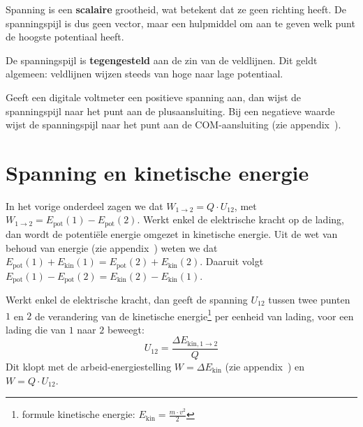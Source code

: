 \documentclass{ximera}
\begin{document}
\begin{remark}[expandable=true,title={Scalaire grootheid}]\nl
Spanning is een \textbf{scalaire} grootheid, wat betekent dat ze geen richting heeft. De spanningspijl is dus geen vector, maar een hulpmiddel om aan te geven welk punt de hoogste potentiaal heeft.
\end{remark}
\begin{remark}[expandable=true,title={Spanningspijl en veldlijnen}]\nl
De spanningspijl is \textbf{tegengesteld} aan de zin van de veldlijnen. Dit geldt algemeen: veldlijnen wijzen steeds van hoge naar lage potentiaal.
\end{remark}
\begin{remark}[expandable=true,title={Spanningspijl en voltmeter}]\nl
Geeft een digitale voltmeter een positieve spanning aan, dan wijst de spanningspijl naar het punt aan de plusaansluiting. Bij een negatieve waarde wijst de spanningspijl naar het punt aan de COM-aansluiting (zie appendix~).
\end{remark}

\section{Spanning en kinetische energie}
In het vorige onderdeel zagen we dat $W_{1 \to 2} = Q \cdot U_{12}$, met $W_{1 \to 2} = E_{\text{pot}}(1) - E_{\text{pot}}(2)$. Werkt enkel de elektrische kracht op de lading, dan wordt de potentiële energie omgezet in kinetische energie. Uit de wet van behoud van energie (zie appendix~) weten we dat $E_{\text{pot}}(1) + E_{\text{kin}}(1) = E_{\text{pot}}(2) + E_{\text{kin}}(2)$. Daaruit volgt $E_{\text{pot}}(1) - E_{\text{pot}}(2) = E_{\text{kin}}(2) - E_{\text{kin}}(1)$.

\begin{proposition}[foldable=true,title={Spanning en kinetische energie}]\nl
Werkt enkel de elektrische kracht, dan geeft de spanning $U_{12}$ tussen twee punten $1$ en $2$ de verandering van de kinetische energie\footnote{formule kinetische energie: $E_{\text{kin}} = \frac{m \cdot v^2}{2}$} per eenheid van lading, voor een lading die van $1$ naar $2$ beweegt:
\begin{equation}\label{eq:spanning_kinetisch}
    U_{12} = \frac{\Delta E_{\text{kin}, 1 \to 2}}{Q}
\end{equation}
Dit klopt met de arbeid-energiestelling $W = \Delta E_{\text{kin}}$ (zie appendix~) en $W = Q \cdot U_{12}$.
\end{proposition}
\end{document}
